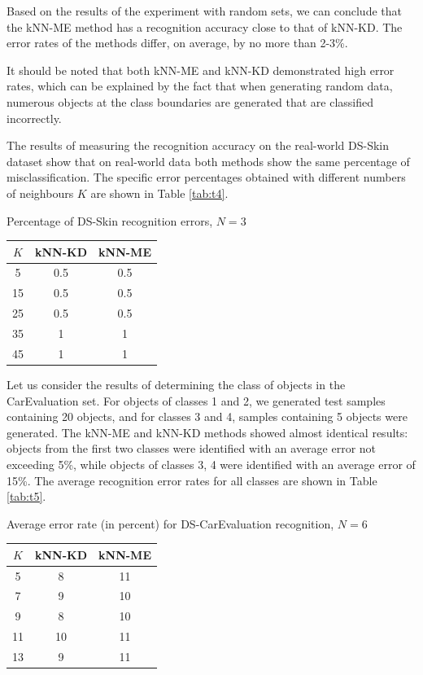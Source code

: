 \documentclass[entropy,article,submit,moreauthors,pdftex]{Definitions/mdpi}
\begin{document}
\begin{paracol}{2}
Based on the results of the experiment with random sets, we can conclude that the kNN-ME method has a recognition accuracy close to that of kNN-KD. The error rates of the methods differ, on average, by no more than 2-3\%.

It should be noted that both kNN-ME and kNN-KD demonstrated high error rates, which can be explained by the fact that when generating random data, numerous objects at the class boundaries are generated that are classified incorrectly.

The results of measuring the recognition accuracy on the real-world DS-Skin dataset show that on real-world data both methods show the same percentage of misclassification. The specific error percentages obtained with different numbers of neighbours $K$ are shown in Table \ref{tab:t4}.

\begin{specialtable}[H] 
  \caption{Percentage of DS-Skin recognition errors, $N=3$}\label{tab:t4}
	\center
\begin{tabular}{ccc}
\toprule
$K$ & kNN-KD & kNN-ME \\
\midrule													
5 & 0.5 & 0.5 \\
15 & 0.5 & 0.5 \\
25 & 0.5 & 0.5\\
35 & 1 & 1\\
45 & 1 & 1\\
\bottomrule
\end{tabular}
\end{specialtable}

Let us consider the results of determining the class of objects in the CarEvaluation set. For objects of classes 1 and 2, we generated test samples containing 20 objects, and for classes 3 and 4, samples containing 5 objects were generated. The kNN-ME and kNN-KD methods showed almost identical results: objects from the first two classes were identified with an average error not exceeding 5\%, while objects of classes 3, 4 were identified with an average error of 15\%. The average recognition error rates for all classes are shown in Table \ref{tab:t5}.

\begin{specialtable}[H] 
  \caption{Average error rate (in percent) for DS-CarEvaluation recognition, $N = 6$}\label{tab:t5}
	\center
\begin{tabular}{ccc}
\toprule
$K$ & kNN-KD & kNN-ME \\
\midrule													
5 & 8 & 11 \\
7 & 9 & 10 \\
9 & 8 & 10 \\
11 & 10 & 11 \\
13 & 9 & 11 \\
\bottomrule
\end{tabular}
\end{specialtable}


\end{paracol}
\end{document}
